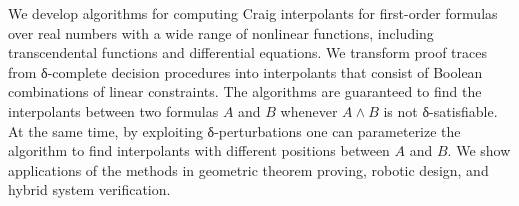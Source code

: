 We develop algorithms for computing Craig interpolants for first-order formulas over real numbers with a wide range of nonlinear functions, including transcendental functions and differential equations.
We transform proof traces from δ-complete decision procedures into interpolants that consist of Boolean combinations of linear constraints.
The algorithms are guaranteed to find the interpolants between two formulas $A$ and $B$ whenever $A ∧ B$ is not δ-satisfiable.
At the same time, by exploiting δ-perturbations one can parameterize the algorithm to find interpolants with different positions between $A$ and $B$.
We show applications of the methods in geometric theorem proving, robotic design, and hybrid system verification.  

